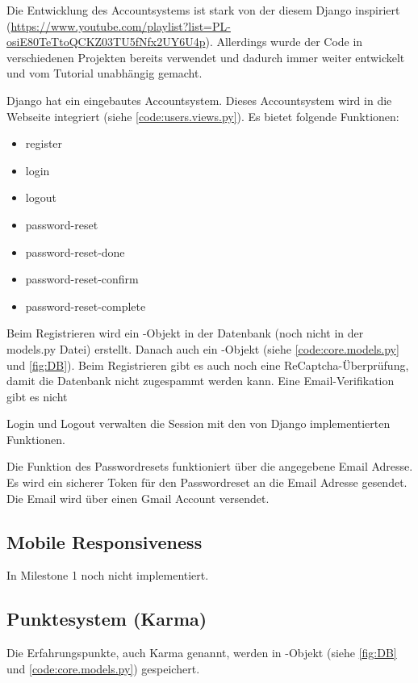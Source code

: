 Die Entwicklung des Accountsystems ist stark von der diesem Django inspiriert
(\url{https://www.youtube.com/playlist?list=PL-osiE80TeTtoQCKZ03TU5fNfx2UY6U4p}).
Allerdings wurde der Code in verschiedenen Projekten bereits verwendet und
dadurch immer weiter entwickelt und vom Tutorial unabhängig gemacht.

Django hat ein eingebautes Accountsystem. Dieses Accountsystem wird in die
Webseite integriert (siehe \ref{code:users.views.py}). Es bietet folgende
Funktionen:
\begin{itemize}
    \item register
    \item login
    \item logout
    \item password-reset
    \item password-reset-done
    \item password-reset-confirm
    \item password-reset-complete
\end{itemize}

Beim Registrieren wird ein -Objekt in der Datenbank (noch nicht in der
models.py Datei) erstellt. Danach auch ein -Objekt (siehe
\ref{code:core.models.py} und \ref{fig:DB}). Beim Registrieren gibt es auch noch
eine ReCaptcha-Überprüfung, damit die Datenbank nicht zugespammt werden kann. Eine Email-Verifikation gibt es nicht

Login und Logout verwalten die Session mit den von Django implementierten
Funktionen.

Die Funktion des Passwordresets funktioniert über die angegebene Email Adresse.
Es wird ein sicherer Token für den Passwordreset an die Email Adresse gesendet.
Die Email wird über einen Gmail Account versendet.

\subsection{Mobile Responsiveness} \label{spez:Mobile}

In Milestone 1 noch nicht implementiert.

\subsection{Punktesystem (Karma)} \label{spez:Karma}

Die Erfahrungspunkte, auch Karma genannt, werden in -Objekt (siehe
\ref{fig:DB} und \ref{code:core.models.py}) gespeichert.

